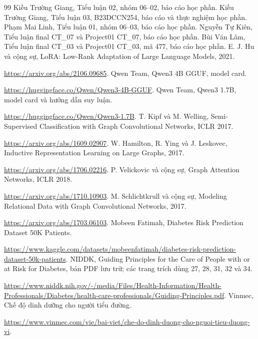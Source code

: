 \begingroup\small{}
\begin{thebibliography}{99}
 Kiều Trường Giang, Tiểu luận 02, nhóm 06--02, báo cáo học phần.
 Kiều Trường Giang, Tiểu luận 03, B23DCCN254, báo cáo và thực nghiệm học phần.
 Phạm Mai Linh, Tiểu luận 01, nhóm 06--03, báo cáo học phần.
 Nguyễn Tự Kiên, Tiểu luận final CT\_07 và Project01 CT\_07, báo cáo học phần.
 Bùi Văn Lâm, Tiểu luận final CT\_03 và Project01 CT\_03, mã 477, báo cáo học phần.
 E. J. Hu và cộng sự, LoRA: Low-Rank Adaptation of Large Language Models, 2021.\par\noindent\url{https://arxiv.org/abs/2106.09685}.
 Qwen Team, Qwen3 4B GGUF, model card.\par\noindent\url{https://huggingface.co/Qwen/Qwen3-4B-GGUF}.
 Qwen Team, Qwen3 1.7B, model card và hướng dẫn suy luận.\par\noindent\url{https://huggingface.co/Qwen/Qwen3-1.7B}.
 T. Kipf và M. Welling, Semi-Supervised Classification with Graph Convolutional Networks, ICLR 2017.\par\noindent\url{https://arxiv.org/abs/1609.02907}.
 W. Hamilton, R. Ying và J. Leskovec, Inductive Representation Learning on Large Graphs, 2017.\par\noindent\url{https://arxiv.org/abs/1706.02216}.
 P. Velickovic và cộng sự, Graph Attention Networks, ICLR 2018.\par\noindent\url{https://arxiv.org/abs/1710.10903}.
 M. Schlichtkrull và cộng sự, Modeling Relational Data with Graph Convolutional Networks, 2017.\par\noindent\url{https://arxiv.org/abs/1703.06103}.
 Mobeen Fatimah, Diabetes Risk Prediction Dataset 50K Patients.\par\noindent\url{https://www.kaggle.com/datasets/mobeenfatimah/diabetes-risk-prediction-dataset-50k-patients}.
 NIDDK, Guiding Principles for the Care of People with or at Risk for Diabetes, bản PDF lưu trữ; các trang trích dùng 27, 28, 31, 32 và 34.\par\noindent\url{https://www.niddk.nih.gov/-/media/Files/Health-Information/Health-Professionals/Diabetes/health-care-professionals/Guiding-Principles.pdf}.
 Vinmec, Chế độ dinh dưỡng cho người tiểu đường.\par\noindent\url{https://www.vinmec.com/vie/bai-viet/che-do-dinh-duong-cho-nguoi-tieu-duong-vi}.
\ifdefined\thesisBibliographyExtension\thesisBibliographyExtension\fi
\end{thebibliography}

\endgroup
